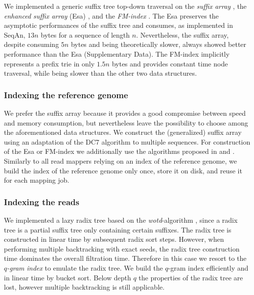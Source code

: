 We implemented a generic suffix tree top-down traversal on the \emph{suffix array} \citep{Manber1990}, the \emph{enhanced suffix array} (Esa) \citep{Abouelhoda2004}, and the \emph{FM-index} \citep{Ferragina2001}.
The Esa preserves the asymptotic performances of the suffix tree and consumes, as implemented in SeqAn, $13n$ bytes for a sequence of length $n$.
Nevertheless, the suffix array, despite consuming $5n$ bytes and being theoretically slower, always showed better performance than the Esa (Supplementary Data).
The FM-index implicitly represents a prefix trie in only $1.5n$ bytes and provides constant time node traversal, while being slower than the other two data structures.

\subsubsection{Indexing the reference genome}

We prefer the suffix array because it provides a good compromise between speed and memory consumption, but nevertheless leave the possibility to choose among the aforementioned data structures.
We construct the (generalized) suffix array using an adaptation of the DC7 algorithm \citep{Dementiev2008} to multiple sequences.
For construction of the Esa or FM-index we additionally use the algorithms proposed in \citep{Kasai2001,Abouelhoda2004} and \citep{Grossi2003}.
Similarly to all read mappers relying on an index of the reference genome, we build the index of the reference genome only once, store it on disk, and reuse it for each mapping job.

\subsubsection{Indexing the reads}

We implemented a lazy radix tree based on the \emph{wotd}-algorithm \citep{Giegerich1999}, since a radix tree is a partial suffix tree only containing certain suffixes. The radix tree is constructed in linear time by subsequent radix sort steps.
However, when performing multiple backtracking with exact seeds, the radix tree construction time dominates the overall filtration time.
Therefore in this case we resort to the \emph{$q$-gram index} to emulate the radix tree.
We build the $q$-gram index efficiently and in linear time by bucket sort.
Below depth $q$ the properties of the radix tree are lost, however multiple backtracking is still applicable.

